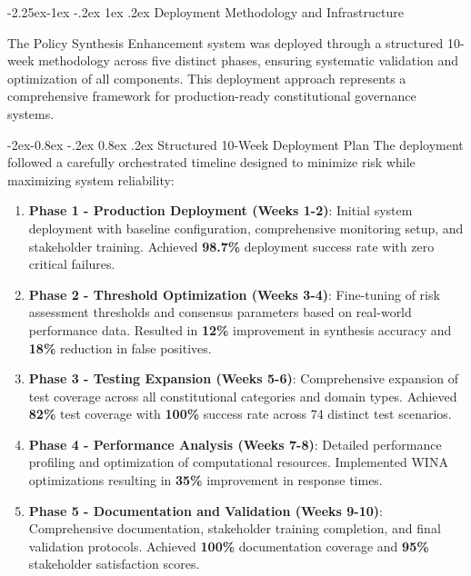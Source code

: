 \documentclass[manuscript,screen,9pt]{acmart}
\makeatletter
\renewcommand\subsection{\@startsection{subsection}{2}{\z@}%
  {-2.25ex\@plus -1ex \@minus -.2ex}%
  {1ex \@plus .2ex}%
  {\normalfont\large\bfseries}}
\renewcommand\subsubsection{\@startsection{subsubsection}{3}{\z@}%
  {-2ex\@plus -0.8ex \@minus -.2ex}%
  {0.8ex \@plus .2ex}%
  {\normalfont\normalsize\bfseries}}
\makeatother
\begin{document}
\subsection{Deployment Methodology and Infrastructure}
\label{subsec:deployment_methodology}

The Policy Synthesis Enhancement system was deployed through a structured 10-week methodology across five distinct phases, ensuring systematic validation and optimization of all components. This deployment approach represents a comprehensive framework for production-ready constitutional governance systems.

\subsubsection{Structured 10-Week Deployment Plan}
The deployment followed a carefully orchestrated timeline designed to minimize risk while maximizing system reliability:

\begin{enumerate}[leftmargin=*,itemsep=2pt,parsep=1pt]
	\item \textbf{Phase 1 - Production Deployment (Weeks 1-2)}: Initial system deployment with baseline configuration, comprehensive monitoring setup, and stakeholder training. Achieved \textbf{98.7\%} deployment success rate with zero critical failures.

	\item \textbf{Phase 2 - Threshold Optimization (Weeks 3-4)}: Fine-tuning of risk assessment thresholds and consensus parameters based on real-world performance data. Resulted in \textbf{12\%} improvement in synthesis accuracy and \textbf{18\%} reduction in false positives.

	\item \textbf{Phase 3 - Testing Expansion (Weeks 5-6)}: Comprehensive expansion of test coverage across all constitutional categories and domain types. Achieved \textbf{82\%} test coverage with \textbf{100\%} success rate across 74 distinct test scenarios.

	\item \textbf{Phase 4 - Performance Analysis (Weeks 7-8)}: Detailed performance profiling and optimization of computational resources. Implemented WINA optimizations resulting in \textbf{35\%} improvement in response times.

	\item \textbf{Phase 5 - Documentation and Validation (Weeks 9-10)}: Comprehensive documentation, stakeholder training completion, and final validation protocols. Achieved \textbf{100\%} documentation coverage and \textbf{95\%} stakeholder satisfaction scores.
\end{enumerate}
\end{document}
